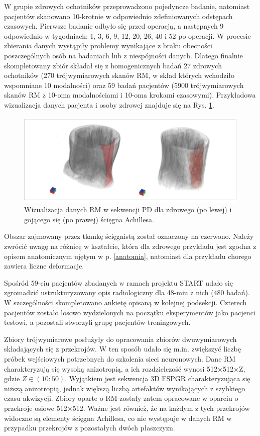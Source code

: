 W grupie zdrowych ochotników przeprowadzono pojedyncze badanie, natomiast pacjentów skanowano 10-krotnie w odpowiednio zdefiniowanych odstępach czasowych. Pierwsze badanie odbyło się przed operacją, a następnych 9 odpowiednio \linebreak w tygodniach: 1, 3, 6, 9, 12, 20, 26, 40 i 52 po operacji. W procesie zbierania danych wystąpiły problemy wynikające z braku obecności poszczególnych osób na badaniach lub z niespójności danych. Dlatego finalnie skompletowany zbiór składał się z homogenicznych badań 27 zdrowych ochotników (270 trójwymiarowych skanów RM, w skład których wchodziło wspomniane 10 modalności) oraz 59 badań pacjentów (5900 trójwymiarowych skanów RM z 10-oma modalnościami i 10-oma krokami czasowymi). Przykładowa wizualizacja danych pacjenta i osoby zdrowej znajduje się na Rys. \ref{fig:MRI_sample}. 
\begin{figure}[h!]
	\includegraphics[width=\textwidth]{figures/Data_MRI_sample.jpg}
	\caption{Wizualizacja danych RM w sekwencji PD dla zdrowego (po lewej) i gojącego się (po prawej) ścięgna Achillesa.}
	 \label{fig:MRI_sample}
\end{figure}
Obszar zajmowany przez tkankę ścięgnistą został oznaczony na czerwono. Należy zwrócić uwagę na różnicę w kształcie, która dla zdrowego przykładu jest zgodna z opisem anatomicznym ujętym w p. \ref{anatomia}, natomiast dla przykładu chorego zawiera liczne deformacje. 

Spośród 59-ciu pacjentów zbadanych w ramach projektu START udało się zgromadzić ustrukturyzowany opis radiologiczny dla 48-miu z nich (480 badań). \linebreak W szczególności skompletowano ankietę opisaną w kolejnej podsekcji. Czterech pacjentów zostało losowo wydzielonych na początku eksperymentów jako pacjenci testowi, a pozostali stworzyli grupę pacjentów treningowych.

Zbiory trójwymiarowe posłużyły do opracowania zbiorów dwuwymiarowych składających się z przekrojów. W ten sposób udało się m.in. zwiększyć liczbę próbek wejściowych potrzebnych do szkolenia sieci neuronowych. Dane RM charakteryzują się wysoką anizotropią, a ich rozdzielczość wynosi 512$\times$512$\times$Z, gdzie $Z\in(10:50)$. Wyjątkiem jest sekwencja 3D FSPGR charakteryzująca się niższą anizotropią, jednak większą liczbą artefaktów wynikających z szybkiego czasu akwizycji. Zbiory oparte o RM zostały zatem opracowane w oparciu o przekroje osiowe 512$\times$512. Ważne jest również, że na każdym z tych przekrojów widoczne są elementy ścięgna Achillesa, co nie występuje w danych RM w przypadku przekrojów z pozostałych dwóch płaszczyzn.

